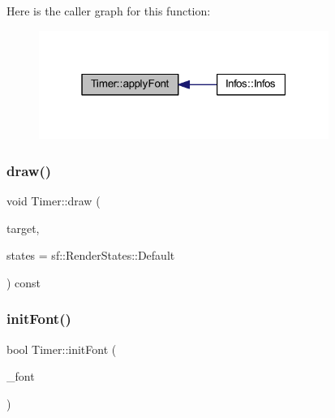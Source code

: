 Here is the caller graph for this function\+:\nopagebreak
\begin{figure}[H]
\begin{center}
\leavevmode
\includegraphics[width=268pt]{class_timer_a735fb44ab37e1fa12679d5ab291c488d_icgraph}
\end{center}
\end{figure}
\mbox{\label{class_timer_a80c3f4ebbd84818de5531f5af3d511de}} 
\subsubsection{\texorpdfstring{draw()}{draw()}}
{\footnotesize\ttfamily void Timer\+::draw (\begin{DoxyParamCaption}\item[{sf\+::\+Render\+Target \&}]{target,  }\item[{sf\+::\+Render\+States}]{states = {\ttfamily sf\+:\+:RenderStates\+:\+:Default} }\end{DoxyParamCaption}) const\hspace{0.3cm}{\ttfamily [virtual]}}

\mbox{\label{class_timer_aac2ddf298c3916e8839e827b387e6973}} 
\subsubsection{\texorpdfstring{init\+Font()}{initFont()}}
{\footnotesize\ttfamily bool Timer\+::init\+Font (\begin{DoxyParamCaption}\item[{const sf\+::\+String \&}]{\+\_\+font }\end{DoxyParamCaption})\hspace{0.3cm}{\ttfamily [static]}}

